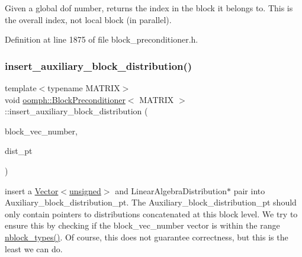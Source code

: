 Given a global dof number, returns the index in the block it belongs to. This is the overall index, not local block (in parallel). 



Definition at line 1875 of file block\+\_\+preconditioner.\+h.

\mbox{\label{classoomph_1_1BlockPreconditioner_a9b3c4072be2bf4f0dfdd18f56a5d51bf}} 
\subsubsection{\texorpdfstring{insert\+\_\+auxiliary\+\_\+block\+\_\+distribution()}{insert\_auxiliary\_block\_distribution()}}
{\footnotesize\ttfamily template$<$typename M\+A\+T\+R\+IX$>$ \\
void \hyperlink{classoomph_1_1BlockPreconditioner}{oomph\+::\+Block\+Preconditioner}$<$ M\+A\+T\+R\+IX $>$\+::insert\+\_\+auxiliary\+\_\+block\+\_\+distribution (\begin{DoxyParamCaption}\item[{const \hyperlink{classoomph_1_1Vector}{Vector}$<$ unsigned $>$ \&}]{block\+\_\+vec\+\_\+number,  }\item[{\hyperlink{classoomph_1_1LinearAlgebraDistribution}{Linear\+Algebra\+Distribution} $\ast$}]{dist\+\_\+pt }\end{DoxyParamCaption})\hspace{0.3cm}{\ttfamily [inline]}}



insert a \hyperlink{classoomph_1_1Vector}{Vector$<$unsigned$>$} and Linear\+Algebra\+Distribution$\ast$ pair into Auxiliary\+\_\+block\+\_\+distribution\+\_\+pt. The Auxiliary\+\_\+block\+\_\+distribution\+\_\+pt should only contain pointers to distributions concatenated at this block level. We try to ensure this by checking if the block\+\_\+vec\+\_\+number vector is within the range \hyperlink{classoomph_1_1BlockPreconditioner_a80808d42be8db74fd58af80b019bf317}{nblock\+\_\+types()}. Of course, this does not guarantee correctness, but this is the least we can do. 



